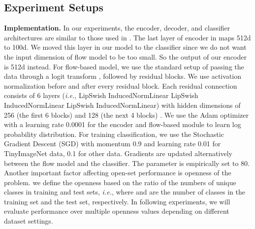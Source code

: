 \documentclass[runningheads]{llncs}
\begin{document}
\subsection{Experiment Setups}
\textbf{Implementation.} In our experiments, the encoder, decoder, and classifier architectures are similar to those used in \cite{neal2018open}. The last layer of encoder in \cite{neal2018open} maps 512d to 100d. We moved this layer in our model to the classifier since we do not want the input dimension of flow model to be too small. So the output of our encoder is 512d instead. For flow-based model, we use the standard setup of passing the data through a logit transform \cite{dinh2016density}, followed by  residual blocks. We use activation normalization \cite{kingma2018glow} before and after every residual block. Each residual connection consists of 6 layers (\textit{i.e.},
LipSwish \cite{chen2019residual}   InducedNormLinear  LipSwish  InducedNormLinear
 LipSwish  InducedNormLinear)
with hidden dimensions of 256 (the first 6 blocks) and 128 (the next 4 blocks) \cite{nalisnick2019hybrid}. We use the Adam optimizer with a learning rate 0.0001 for the encoder and flow-based module to learn log probability distribution. For training classification, we use the Stochastic Gradient Descent (SGD) with momentum 0.9 and learning rate 0.01 for TinyImageNet data, 0.1 for other data. Gradients are updated alternatively between the flow model and the classifier. The parameter  is empirically set to 80. Another important factor affecting open-set performance is openness of the problem. we define the openness based on the ratio of the numbers of unique classes in training and test sets, \textit{i.e.},  where  and  are the number of classes in the training set and the test set, respectively.
In following experiments, we will evaluate performance over multiple openness values depending on different dataset settings.
\end{document}
